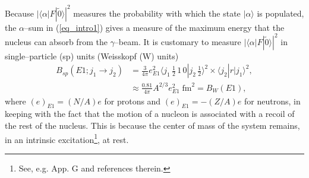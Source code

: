 Because $|\langle \alpha|F|\tilde 0\rangle|^2$ measures the probability with which the state $|\alpha\rangle$ is populated, the $\alpha$--sum in (\ref{eq_intro1}) gives a measure of the maximum energy that the nucleus can absorb from the $\gamma$--beam. It is customary to measure  $|\langle \alpha|F|\tilde0\rangle|^2$ in single--particle (sp) units (Weisskopf (W) units)
\begin{align}\label{eq1.2.5}
\nonumber B_{sp}(E1;j_1\rightarrow j_2)&=\frac{3}{4\pi}e^2_{E1}\langle j_1\, \tfrac{1}{2}\,1\,0|j_2\,\tfrac{1}{2}\rangle^2\times \langle j_2|r|j_1\rangle^2,\\
&\approx \frac{0.81}{4\pi}A^{2/3}e^2_{E1}\;\text{fm}^2=B_W(E1),
\end{align}
where $(e)_{E1}=(N/A)e$ for protons and  $(e)_{E1}=-(Z/A)e$ for neutrons, in keeping with the fact that the motion of a nucleon is associated with a recoil of the rest of the nucleus. This is because the center of mass  of the system remains,   in an intrinsic excitation\footnote{See, e.g. \cite{Broglia:16} App. G and references therein.}, at rest. 


